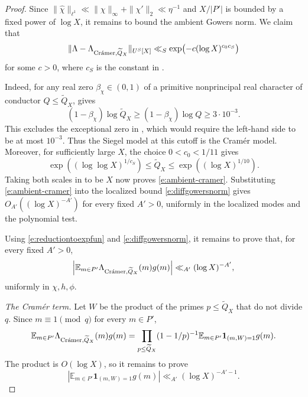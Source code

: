\documentclass[12pt]{amsart}
\newcommand{\1}{\mathbf 1}
\newcommand{\Cramer}{\textup{Cr\'amer}}
\theoremstyle{definition}
\begin{document}
\begin{proof}
Since \(\|\widehat\chi\|_{\ell^1}\ll
\|\chi\|_\infty+\|\chi'\|_2\ll\eta^{-1}\) and \(X/|P'|\) is
bounded by a fixed power of \(\log X\), it remains to bound the
ambient Gowers norm. We claim that
\begin{equation}\label{e:ambient-cramer}
 \|\Lambda-\Lambda_{\Cramer,\widetilde Q_X}\|_{U^S[X]}
 \ll_S\exp\bigl(-c(\log X)^{c_0c_S}\bigr)
\end{equation}
for some \(c>0\), where \(c_S\) is the constant in
\cite[Lemma~3.1]{KMTT}.

Indeed, for any real zero \(\beta_\chi\in(0,1)\) of a primitive
nonprincipal real character of conductor \(Q\leq\widetilde Q_X\),
\cite[Theorem~1.1]{BanksSiegel} gives
\[
 (1-\beta_\chi)\log\widetilde Q_X
 \geq (1-\beta_\chi)\log Q
 \geq 3\cdot10^{-3}.
\]
This excludes the exceptional zero in \cite[Definition~2.3]{KMTT},
which would require the left-hand side to be at most \(10^{-3}\).
Thus the Siegel model at this cutoff is the Cram\'er model.
Moreover, for sufficiently large \(X\), the choice \(0<c_0<1/11\)
gives
\[
 \exp((\log\log X)^{1/c_S})
 \leq \widetilde Q_X
 \leq \exp((\log X)^{1/10}).
\]
Taking both scales in \cite[Lemma~3.1]{KMTT} to be \(X\) now
proves \eqref{e:ambient-cramer}.
Substituting \eqref{e:ambient-cramer} into the localized bound \eqref{e:diffgowersnorm}
gives \(O_{A'}((\log X)^{-A'})\) for every fixed \(A'>0\),
uniformly in the localized modes and the polynomial test.

Using \eqref{e:reductiontoexpfun} and \eqref{e:diffgowersnorm}, it remains to prove that, for every fixed \(A'>0\),
\begin{align}\label{e:cramerreduest}
     \left|\mathbb E_{m\in P'}
   \Lambda_{\Cramer,\widetilde Q_X}(m)g(m)\right|
 \ll_{A'}(\log X)^{-A'},
\end{align}
uniformly in \(\chi,h,\phi\). 

\medskip
\noindent\emph{The Cram\'er term.}
Let $W$ be the product of the primes $p\leq\widetilde Q_X$ that
do not divide $q$. Since $m\equiv1\pmod q$ for every $m\in P'$,
\[
 \mathbb E_{m\in P'}
 \Lambda_{\Cramer,\widetilde Q_X}(m)g(m)
 =
 \prod_{p\leq\widetilde Q_X}(1-1/p)^{-1}
 \mathbb E_{m\in P'}\mathbf1_{(m,W)=1}g(m).
\]
The product is $O(\log X)$, so it remains to prove
\[
 \left|\mathbb E_{m\in P'}\mathbf1_{(m,W)=1}g(m)\right|
 \ll_{A'}(\log X)^{-A'-1}.
\]


\end{proof}
\end{document}

